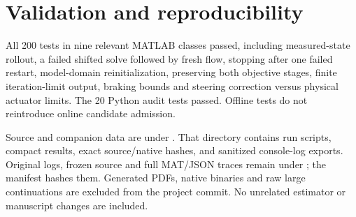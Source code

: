 \documentclass[10pt]{article}
\begin{document}
\section{Validation and reproducibility}
All 200 tests in nine relevant MATLAB classes passed, including measured-state rollout, a failed shifted solve followed by fresh flow, stopping after one failed restart, model-domain reinitialization, preserving both objective stages, finite iteration-limit output, braking bounds and steering correction versus physical actuator limits. The 20 Python audit tests passed. Offline tests do not reintroduce online candidate admission.

Source and companion data are under . That directory contains run scripts, compact results, exact source/native hashes, and sanitized console-log exports. Original logs, frozen source and full MAT/JSON traces remain under ; the manifest hashes them. Generated PDFs, native binaries and raw large continuations are excluded from the project commit. No unrelated estimator or manuscript changes are included.
\end{document}
